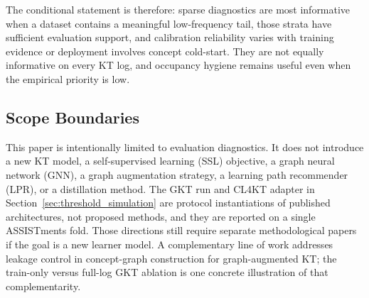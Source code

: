 The conditional statement is therefore: sparse diagnostics are most informative when a dataset contains a meaningful low-frequency tail, those strata have sufficient evaluation support, and calibration reliability varies with training evidence or deployment involves concept cold-start. They are not equally informative on every KT log, and occupancy hygiene remains useful even when the empirical priority is low.

\subsection{Scope Boundaries}
This paper is intentionally limited to evaluation diagnostics. It does not introduce a new KT model, a self-supervised learning (SSL) objective, a graph neural network (GNN), a graph augmentation strategy, a learning path recommender (LPR), or a distillation method. The GKT run and CL4KT adapter in Section~\ref{sec:threshold_simulation} are protocol instantiations of published architectures, not proposed methods, and they are reported on a single ASSISTments fold. Those directions still require separate methodological papers if the goal is a new learner model. A complementary line of work addresses leakage control in concept-graph construction for graph-augmented KT; the train-only versus full-log GKT ablation is one concrete illustration of that complementarity.


